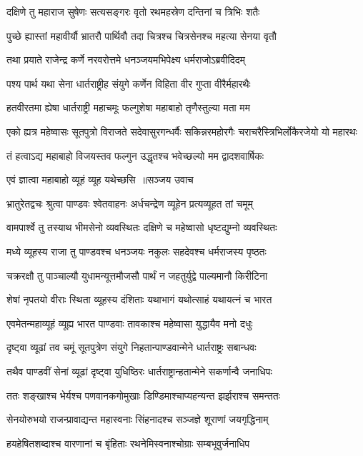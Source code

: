 \twolineshloka
{दक्षिणे तु महाराज सुषेणः सत्यसङ्गरः}
{वृतो रथमहस्रेण दन्तिनां च त्रिभिः शतैः}


\twolineshloka
{पुच्छे ह्यास्तां महावीर्यौ भ्रातरौ पार्थिवौ तदा}
{चित्रश्च चित्रसेनश्च महत्या सेनया वृतौ}


\twolineshloka
{तथा प्रयाते राजेन्द्र कर्णे नरवरोत्तमे}
{धनञ्जयमभिपेक्ष्य धर्मराजोऽब्रवीदिदम्}


\twolineshloka
{पश्य पार्थ यथा सेना धार्तराष्ट्रीह संयुगे}
{कर्णेन विहिता वीर गुप्ता वीरैर्महारथैः}


\twolineshloka
{हतवीरतमा ह्येषा धार्तराष्ट्री महाचमूः}
{फल्गुशेषा महाबाहो तृणैस्तुल्या मता मम}


\threelineshloka
{एको ह्यत्र महेष्वासः सूतपुत्रो विराजते}
{सदेवासुरगन्धर्वैः सकिन्नरमहोरगैः}
{चराचरैस्त्रिभिर्लोकैरजेयो यो महारथः}


\twolineshloka
{तं हत्वाऽद्य महाबाहो विजयस्तव फल्गुन}
{उद्धृतश्च भवेच्छल्यो मम द्वादशवार्षिकः}


\twolineshloka
{एवं ज्ञात्वा महाबाहो व्यूहं व्यूह यथेच्छसि ॥सञ्जय उवाच}
{}


\twolineshloka
{भ्रातुरेतद्वचः श्रुत्वा पाण्डवः श्वेतवाहनः}
{अर्धचन्द्रेण व्यूहेन प्रत्यव्यूहत तां चमूम्}


\twolineshloka
{वामपार्श्वे तु तस्याथ भीमसेनो व्यवस्थितः}
{दक्षिणे च महेष्वासो धृष्टद्युम्नो व्यवस्थितः}


\twolineshloka
{मध्ये व्यूहस्य राजा तु पाण्डवश्च धनञ्जयः}
{नकुलः सहदेवश्च धर्मराजस्य पृष्ठतः}


\twolineshloka
{चक्ररक्षौ तु पाञ्चाल्यौ युधामन्यूत्तमौजसौ}
{पार्थं न जहतुर्युद्वे पाल्यमानौ किरीटिना}


\twolineshloka
{शेषां नृपतयो वीराः स्थिता व्यूहस्य दंशिताः}
{यथाभागं यथोत्साहं यथायत्नं च भारत}


\twolineshloka
{एवमेतन्महाव्यूहं व्यूह्य भारत पाण्डवाः}
{तावकाश्च महेष्वासा युद्धायैव मनो दधुः}


\twolineshloka
{दृष्ट्वा व्यूढां तव चमूं सूतपुत्रेण संयुगे}
{निहतान्पाण्डवान्मेने धार्तराष्ट्रः सबान्धवः}


\twolineshloka
{तथैव पाण्डवीं सेनां व्यूढां दृष्ट्वा युधिष्ठिरः}
{धार्तराष्ट्रान्हतान्मेने सकर्णान्वै जनाधिपः}


\twolineshloka
{ततः शङ्खाश्च भेर्यश्च पणवानकगोमुखाः}
{डिण्डिमाश्चाप्यहन्यन्त झर्झराश्च समन्ततः}


\twolineshloka
{सेनयोरुभयो राजन्प्रावाद्यन्त महास्वनाः}
{सिंहनादश्च सञ्जज्ञे शूराणां जयगृद्धिनाम्}


\twolineshloka
{हयहेषितशब्दाश्च वारणानां च बृंहिताः}
{रथनेमिस्वनाश्चोग्राः सम्बभूवुर्जनाधिप}


